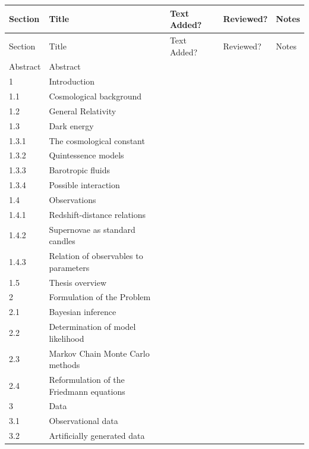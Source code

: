 \documentclass{article}
\newcommand{\done}{\textcolor{green!60!black}{\ding{51}}}
\begin{document}
\begin{longtable}{|p{2.2cm}|p{6.5cm}|p{2.2cm}|p{2.2cm}|p{2.5cm}|}
\hline
Section & Title & Text Added? & Reviewed? & Notes \\
\hline
\endfirsthead

\hline
Section & Title & Text Added? & Reviewed? & Notes \\
\hline
\endhead

Abstract & Abstract & \done & \done & \\

1 & Introduction & \done & \done & \\
1.1 & Cosmological background & \done & \done & \\
1.2 & General Relativity & \done & \done & \\
1.3 & Dark energy & \done & \done & \\
1.3.1 & The cosmological constant & \done & \done & \\
1.3.2 & Quintessence models & \done & \done & \\
1.3.3 & Barotropic fluids & \done & \done & \\
1.3.4 & Possible interaction & \done & \done & \\
1.4 & Observations & \done & \done & \\
1.4.1 & Redshift-distance relations & \done & \done & \\
1.4.2 & Supernovae as standard candles & \done & \done & \\
1.4.3 & Relation of observables to parameters & \done & \done & \\
1.5 & Thesis overview & \done & \done & \\

2 & Formulation of the Problem & \done & \done & \\
2.1 & Bayesian inference & \done & \done & \\
2.2 & Determination of model likelihood & \done & \done & \\
2.3 & Markov Chain Monte Carlo methods & \done & \done & \\
2.4 & Reformulation of the Friedmann equations & \done & \done & \\

3 & Data  & \done & \done & \\
3.1 & Observational data  & \done & \done & \\
3.2 & Artificially generated data  & \done & \done & \\


\end{longtable}
\end{document}
